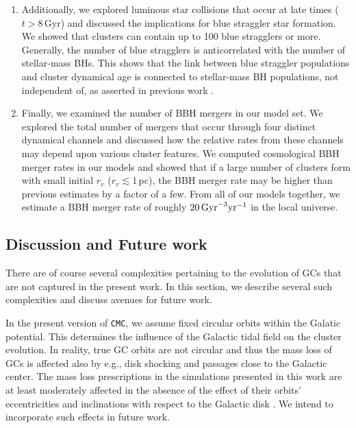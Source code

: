 \documentclass[twocolumn,tighten]{aastex63}
\begin{document}
\begin{enumerate}
\item Additionally, we explored luminous star collisions that occur at late times ($t>8\,$Gyr) and discussed the implications for blue straggler star formation. We showed that clusters can contain up to 100 blue stragglers or more. Generally, the number of blue stragglers is anticorrelated with the number of stellar-mass BHs. This shows that the link between blue straggler populations and cluster dynamical age \citep[see, e.g.,][]{Ferraro2012} is connected to stellar-mass BH populations, not independent of, as asserted in previous work \citep{Ferraro2019}.

\item Finally, we examined the number of BBH mergers in our model set. We explored the total number of mergers that occur through four distinct dynamical channels and discussed how the relative rates from these channels may depend upon various cluster features. We computed cosmological BBH merger rates in our models and showed that if a large number of clusters form with small initial $r_v$ ($r_v \lesssim 1\,$pc), the BBH merger rate may be higher than previous estimates by a factor of a few. From all of our models together, we estimate a BBH merger rate of roughly $20\,\rm{Gyr}^{-3}\rm{yr}^{-1}$ in the local universe. 

\end{enumerate}

\subsection{Discussion and Future work}

There are of course several complexities pertaining to the evolution of GCs that are not captured in the present work. In this section, we describe several such complexities and discuss avenues for future work.

In the present version of \texttt{CMC}, we assume fixed circular orbits within the Galatic potential. This determines the influence of the Galactic tidal field on the cluster evolution. In reality, true GC orbits are not circular \citep[for a recent review, see][]{Baumgardt2019} and thus the mass loss of GCs is affected also by e.g., disk shocking and passages close to the Galactic center. The mass loss prescriptions in the simulations presented in this work are at least moderately affected in the absence of the effect of their orbits' eccentricities and inclinations with respect to the Galactic disk \citep[see, e.g.,][for a discussion of some of these effects]{BaumgardtMakino2003}. We intend to incorporate such effects in future work.
\end{document}
